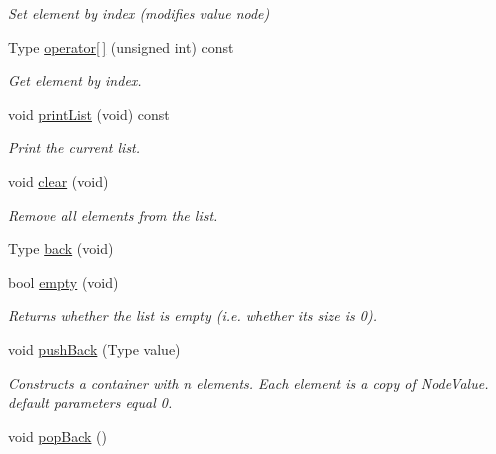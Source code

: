 \begin{DoxyCompactItemize}
\begin{DoxyCompactList}\small\item\em Set element by index (modifies value node) \end{DoxyCompactList}\item 
Type \hyperlink{classList_a3898d41810652b70aa2e2089c39bfdde}{operator\mbox{[}$\,$\mbox{]}} (unsigned int) const
\begin{DoxyCompactList}\small\item\em Get element by index. \end{DoxyCompactList}\item 
\mbox{\label{classList_a0bb7f24f38d860cc5b7e58961eeca294}} 
void \hyperlink{classList_a0bb7f24f38d860cc5b7e58961eeca294}{print\+List} (void) const
\begin{DoxyCompactList}\small\item\em Print the current list. \end{DoxyCompactList}\item 
\mbox{\label{classList_a2d5977549c7c99d2fe92aece3265f06a}} 
void \hyperlink{classList_a2d5977549c7c99d2fe92aece3265f06a}{clear} (void)
\begin{DoxyCompactList}\small\item\em Remove all elements from the list. \end{DoxyCompactList}\item 
Type \hyperlink{classList_ab7b810c9f307470ccf357d0ba328f5b5}{back} (void)
\item 
bool \hyperlink{classList_a9326434dfbb5adf23aac5040e9d7a8f7}{empty} (void)
\begin{DoxyCompactList}\small\item\em Returns whether the list is empty (i.\+e. whether its size is 0). \end{DoxyCompactList}\item 
void \hyperlink{classList_ad69aa8e4c38ee6a5bf07f8cdd5047bd1}{push\+Back} (Type value)
\begin{DoxyCompactList}\small\item\em Constructs a container with n elements. Each element is a copy of Node\+Value. default parameters equal 0. \end{DoxyCompactList}\item 
\mbox{\label{classList_ad580c7d0cc671fcad5eae73932e1dd55}} 
void \hyperlink{classList_ad580c7d0cc671fcad5eae73932e1dd55}{pop\+Back} ()

\end{DoxyCompactItemize}
